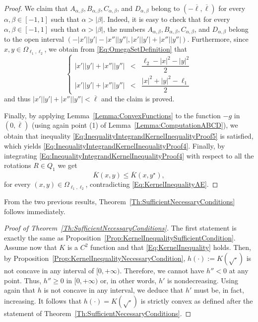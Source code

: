 \documentclass[12pt,reqno]{amsart}
\theoremstyle{definition}
\theoremstyle{remark}
\newcommand\beqc[1]{\left\{\begin{array}{#1}}
\newcommand\eeqc{\end{array} \right.}
\def\PDEsystem{rcll}
\numberwithin{equation}{section}
\begin{document}
\begin{proof}
		
		We claim that $A_{\alpha,\beta}, B_{\alpha,\beta}, C_{\alpha,\beta}$, and $D_{\alpha,\beta}$ belong to $(-\overline{\ell},\overline{\ell})$ for every $\alpha, \beta \in [-1,1]$ such that $\alpha>|\beta|$. Indeed, it is easy to check that for every $\alpha, \beta \in [-1,1]$ such that $\alpha>|\beta|$, the numbers $A_{\alpha,\beta}, B_{\alpha,\beta}, C_{\alpha,\beta}$, and $D_{\alpha,\beta}$ belong to the open interval $(-|x'||y'|-|x''||y''|,|x'||y'|+|x''||y''|)$. Furthermore, since $x,y \in \Omega_{\ell_1,\ell_2}$, we obtain from \eqref{Eq:OmegaSetDefinition} that
		$$
		\beqc{\PDEsystem}
		|x'||y'|+|x''||y''|&<&\dfrac{\ell_2-|x|^2-|y|^2}{2}\\
		|x'||y'|+|x''||y''|&<&\dfrac{|x|^2+|y|^2-\ell_1}{2}
		\eeqc 
		$$
		and thus $ |x'||y'|+|x''||y''|<\overline{\ell}$ and the claim is proved.
		
		Finally, by applying Lemma~\ref{Lemma:ConvexFunctions} to the function $-g$ in $(0,\overline{\ell})$ (using again  point (1) of Lemma~\ref{Lemma:ComputationABCD}), we obtain that inequality \eqref{Eq:InequalityIntegrandKernelInequalityProof5} is satisfied, which yields \eqref{Eq:InequalityIntegrandKernelInequalityProof4}. Finally, by integrating \eqref{Eq:InequalityIntegrandKernelInequalityProof4} with respect to all the rotations $R\in Q_1$ we get $$ \overline{K}(x,y) \leq \overline{K}(x, y^\star),$$ for every $(x,y)\in \Omega_{\ell_1,\ell_2}$, contradicting \eqref{Eq:KernelInequalityAE}.
	\end{proof}
	
	From the two previous results, Theorem~\ref{Th:SufficientNecessaryConditions} follows immediately.
	
	\begin{proof}[Proof of Theorem~\ref{Th:SufficientNecessaryConditions}]
		The first statement is exactly the same as Proposition~\ref{Prop:KernelInequalitySufficientCondition}. Assume now that $K$ is a $C^2$ function and that \eqref{Eq:KernelInequality} holds. Then, by Proposition~\ref{Prop:KernelInequalityNecessaryCondition}, $h(\cdot) := K(\sqrt{\cdot})$ is not concave in any interval of $[0,+\infty)$. Therefore, we cannot have $h''<0$ at any point. Thus, $h''\geq 0$ in $[0,+\infty)$ or, in other words, $h'$ is nondecreasing. Using again that $h$ is not concave in any interval, we deduce that $h'$ must be, in fact, increasing. It follows that $h(\cdot) = K(\sqrt{\cdot})$ is strictly convex as defined after the statement of Theorem~\ref{Th:SufficientNecessaryConditions}.
	\end{proof}
	
\end{document}
